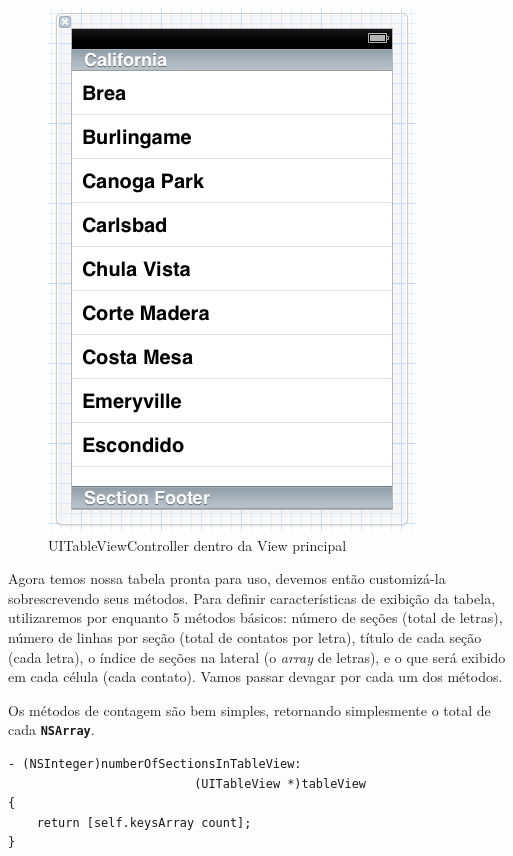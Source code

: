 \documentclass[a4paper,12pt,brazil,doubleside]{book}
\begin{document}
\begin{singlespace}
\begin{figure}[H]
  \centering
  \includegraphics[width=.75\textwidth]{figuras/table/table9.png}
  \caption{UITableViewController dentro da View principal}
  \label{fig:a}
\end{figure}

\bigskip


Agora temos nossa tabela pronta para uso, devemos então customizá-la sobrescrevendo seus métodos. Para definir características de exibição da tabela, utilizaremos por enquanto 5 métodos básicos: número de seções (total de letras), número de linhas por seção (total de contatos por letra), título de cada seção (cada letra), o índice de seções na lateral (o \emph{array} de letras), e o que será exibido em cada célula (cada contato). Vamos passar devagar por cada um dos métodos.

Os métodos de contagem são bem simples, retornando simplesmente o total de cada \texttt{\textbf{NSArray}}.

\begin{listing}[H]
\begin{verbatim}
- (NSInteger)numberOfSectionsInTableView:
                          (UITableView *)tableView
{
    return [self.keysArray count];
}


\end{verbatim}
\end{listing}
\end{singlespace}
\end{document}
